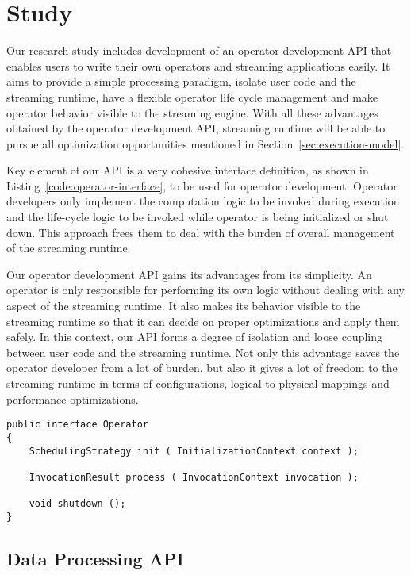 \section{Study}\label{sec:study}

Our research study includes development of an operator development API that enables users to write their own operators and streaming applications easily. It aims to provide a simple processing paradigm, isolate user code and the streaming runtime, have a flexible operator life cycle management and make operator behavior visible to the streaming engine. With all these advantages obtained by the operator development API, streaming runtime will be able to pursue all optimization opportunities mentioned in Section~\ref{sec:execution-model}. 

Key element of our API is a very cohesive interface definition, as shown in Listing~\ref{code:operator-interface}, to be used for operator development. Operator developers only implement the computation logic to be invoked during execution and the life-cycle logic to be invoked while operator is being initialized or shut down. This approach frees them to deal with the burden of overall management of the streaming runtime.

Our operator development API gains its advantages from its simplicity. An operator is only responsible for performing its own logic without dealing with any aspect of the streaming runtime. It also makes its behavior visible to the streaming runtime so that it can decide on proper optimizations and apply them safely. In this context, our API forms a degree of isolation and loose coupling between user code and the streaming runtime. Not only this advantage saves the operator developer from a lot of burden, but also it gives a lot of freedom to the streaming runtime in terms of configurations, logical-to-physical mappings and performance optimizations.

\lstset{language=JAVA, caption="Operator Interface"}
\begin{lstlisting}[frame=single] 
public interface Operator
{
    SchedulingStrategy init ( InitializationContext context );
	
    InvocationResult process ( InvocationContext invocation );

    void shutdown ();
}
\end{lstlisting}
\label{code:operator-interface}

\subsection{Data Processing API}\label{sec:data-processing-api}

